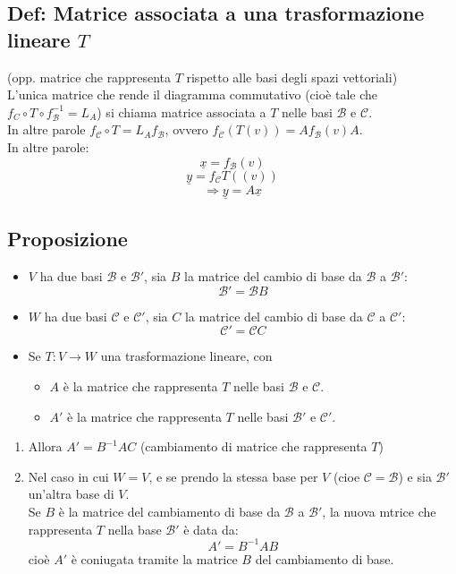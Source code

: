 \begin{itemize}
\subsection{Def: Matrice associata a una trasformazione lineare $T$}
(opp. matrice che rappresenta $T$ rispetto alle basi degli spazi vettoriali)
\\L'unica matrice che rende il diagramma commutativo (cioè tale che $f_C\circ T\circ f_{\mathcal{B}}^{-1}=L_A$) si chiama matrice associata a $T$ nelle basi $\mathcal{B}$ e $\mathcal{C}$.
\\In altre parole $f_{\mathcal{C}}\circ T= L_Af_{\mathcal{B}}$, ovvero $f_{\mathcal{C}}(T(v))= Af_{\mathcal{B}}(v)A$.
\\In altre parole:
\[\underline{x}=f_{\mathcal{B}}(v)\]
\[\underline{y}=f_{\mathcal{C}}T((v))\]
\[\Rightarrow \underline{y}=A\underline{x}\]

\subsection{Proposizione}
\begin{itemize}
\item $V$ ha due basi $\mathcal{B}$ e $\mathcal{B}'$, sia $B$ la matrice del cambio di base da $\mathcal{B}$ a $\mathcal{B}'$:
  \[\mathcal{B}'=\mathcal{B}B\]

\item $W$ ha due basi $\mathcal{C}$ e $\mathcal{C}'$, sia $C$ la matrice del cambio di base da $\mathcal{C}$ a $\mathcal{C}'$:
  \[\mathcal{C}'=\mathcal{C}C\]

\item Se $T:V\rightarrow W$ una trasformazione lineare, con
  \begin{itemize}
  \item $A$ è la matrice che rappresenta $T$ nelle basi $\mathcal{B}$ e $\mathcal{C}$.
  \item $A'$ è la matrice che rappresenta $T$ nelle basi $\mathcal{B}'$ e $\mathcal{C}'$.
  \end {itemize}
  
\end{itemize}

\begin{enumerate}

\item Allora $A'=B^{-1}AC$ (cambiamento di matrice che rappresenta $T$)
\item Nel caso in cui $W=V$, e se prendo la stessa base per $V$ (cioe $\mathcal{C}=\mathcal{B}$) e sia $\mathcal{B}'$ un'altra base di $V$.
\\Se $B$ è la matrice del cambiamento di base da $\mathcal{B}$ a $\mathcal{B}'$, la nuova mtrice che rappresenta $T$ nella base $\mathcal{B}'$ è data da:
  \[A'=B^{-1}AB\]
  cioè $A'$ è coniugata tramite la matrice $B$ del cambiamento di base.

\end{enumerate}
\end{itemize}

